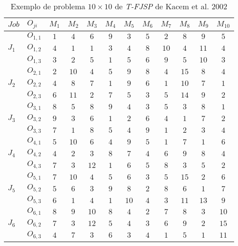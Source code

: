 \begin{table}[htb]
    \centering
    \caption{Exemplo de problema $10\times10$ de \textit{T-FJSP} de Kacem et al. 2002}
    \label{fig:ex-instancia-problema-TFJSP}
    \begin{tabular}[t]{llcccccccccc}
\hline
$Job$&$O_{ji}$&$M_1$&$M_2$&$M_3$&$M_4$&$M_5$&$M_6$&$M_7$&$M_8$&$M_9$&$M_{10}$\\
\hline
\multirow{3}{*}{$J_1$}&$O_{1,1}$ & $1$ & $4$ & $6$ & $9$ & $3$ & $5$ & $2$ & $8$ & $9$ & $5$\\
&$O_{1,2}$ & $4$ & $1$ & $1$ & $3$ & $4$ & $8$ & $10$ & $4$ & $11$ & $4$\\
&$O_{1,3}$ & $3$ & $2$ & $5$ & $1$ & $5$ & $6$ & $9$ & $5$ & $10$ & $3$\\
\multirow{3}{*}{$J_2$}&$O_{2,1}$ & $2$ & $10$ & $4$ & $5$ & $9$ & $8$ & $4$ & $15$ & $8$ & $4$\\
&$O_{2,2}$ & $4$ & $8$ & $7$ & $1$ & $9$ & $6$ & $1$ & $10$ & $7$ & $1$\\
&$O_{2,3}$ & $6$ & $11$ & $2$ & $7$ & $5$ & $3$ & $5$ & $14$ & $9$ & $2$\\
\multirow{3}{*}{$J_3$}&$O_{3,1}$ & $8$ & $5$ & $8$ & $9$ & $4$ & $3$ & $5$ & $3$ & $8$ & $1$\\
&$O_{3,2}$ & $9$ & $3$ & $6$ & $1$ & $2$ & $6$ & $4$ & $1$ & $7$ & $2$\\
&$O_{3,3}$ & $7$ & $1$ & $8$ & $5$ & $4$ & $9$ & $1$ & $2$ & $3$ & $4$\\
\multirow{3}{*}{$J_4$}&$O_{4,1}$ & $5$ & $10$ & $6$ & $4$ & $9$ & $5$ & $1$ & $7$ & $1$ & $6$\\
&$O_{4,2}$ & $4$ & $2$ & $3$ & $8$ & $7$ & $4$ & $6$ & $9$ & $8$ & $4$\\
&$O_{4,3}$ & $7$ & $3$ & $12$ & $1$ & $6$ & $5$ & $8$ & $3$ & $5$ & $2$\\
\multirow{3}{*}{$J_5$}&$O_{5,1}$ & $7$ & $10$ & $4$ & $5$ & $6$ & $3$ & $5$ & $15$ & $2$ & $6$\\
&$O_{5,2}$ & $5$ & $6$ & $3$ & $9$ & $8$ & $2$ & $8$ & $6$ & $1$ & $7$\\
&$O_{5,3}$ & $6$ & $1$ & $4$ & $1$ & $10$ & $4$ & $3$ & $11$ & $13$ & $9$\\
\multirow{3}{*}{$J_6$}&$O_{6,1}$ & $8$ & $9$ & $10$ & $8$ & $4$ & $2$ & $7$ & $8$ & $3$ & $10$\\
&$O_{6,2}$ & $7$ & $3$ & $12$ & $5$ & $4$ & $3$ & $6$ & $9$ & $2$ & $15$\\
&$O_{6,3}$ & $4$ & $7$ & $3$ & $6$ & $3$ & $4$ & $1$ & $5$ & $1$ & $11$\\

\end{tabular}
\end{table}
